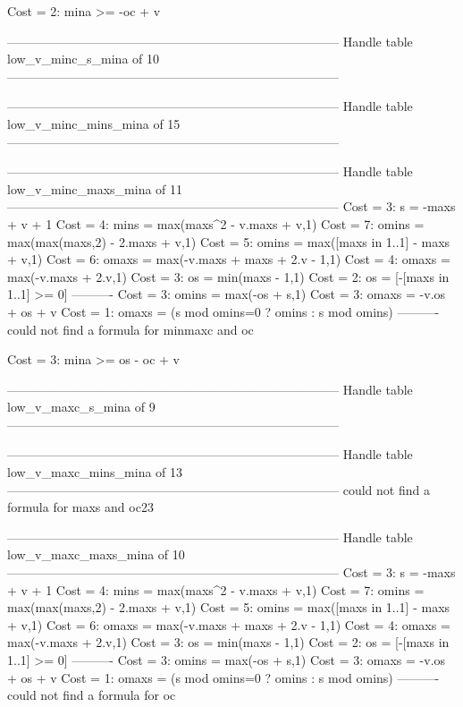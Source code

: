 Cost =  2:  mina >= -oc + v

--------------------------------------------------------------------------------
Handle table low_v_minc_s_mina of 10
--------------------------------------------------------------------------------


--------------------------------------------------------------------------------
Handle table low_v_minc_mins_mina of 15
--------------------------------------------------------------------------------


--------------------------------------------------------------------------------
Handle table low_v_minc_maxs_mina of 11
--------------------------------------------------------------------------------
Cost =  3:  s       = -maxs + v + 1
Cost =  4:  mins    = max(maxs^2 - v.maxs + v,1)
Cost =  7:  omins   = max(max(maxs,2) - 2.maxs + v,1)
Cost =  5:  omins   = max([maxs in 1..1] - maxs + v,1)
Cost =  6:  omaxs   = max(-v.maxs + maxs + 2.v - 1,1)
Cost =  4:  omaxs   = max(-v.maxs + 2.v,1)
Cost =  3:  os      = min(maxs - 1,1)
Cost =  2:  os      = [-[maxs in 1..1] >= 0]
----------
Cost =  3:  omins   = max(-os + s,1)
Cost =  3:  omaxs   = -v.os + os + v
Cost =  1:  omaxs   = (s mod omins=0 ? omins : s mod omins)
----------
could not find a formula for minmaxc and oc

Cost =  3:  mina >= os - oc + v

--------------------------------------------------------------------------------
Handle table low_v_maxc_s_mina of 9
--------------------------------------------------------------------------------


--------------------------------------------------------------------------------
Handle table low_v_maxc_mins_mina of 13
--------------------------------------------------------------------------------
could not find a formula for maxs and oc23


--------------------------------------------------------------------------------
Handle table low_v_maxc_maxs_mina of 10
--------------------------------------------------------------------------------
Cost =  3:  s     = -maxs + v + 1
Cost =  4:  mins  = max(maxs^2 - v.maxs + v,1)
Cost =  7:  omins = max(max(maxs,2) - 2.maxs + v,1)
Cost =  5:  omins = max([maxs in 1..1] - maxs + v,1)
Cost =  6:  omaxs = max(-v.maxs + maxs + 2.v - 1,1)
Cost =  4:  omaxs = max(-v.maxs + 2.v,1)
Cost =  3:  os    = min(maxs - 1,1)
Cost =  2:  os    = [-[maxs in 1..1] >= 0]
----------
Cost =  3:  omins = max(-os + s,1)
Cost =  3:  omaxs = -v.os + os + v
Cost =  1:  omaxs = (s mod omins=0 ? omins : s mod omins)
----------
could not find a formula for oc

